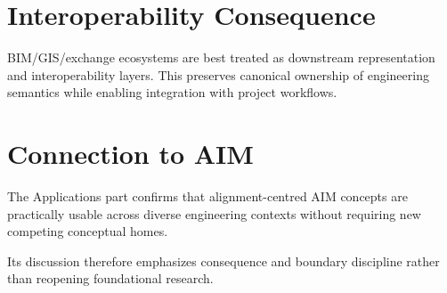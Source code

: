 \section{Interoperability Consequence}

BIM/GIS/exchange ecosystems are best treated as downstream
representation and interoperability layers. This preserves canonical
ownership of engineering semantics while enabling integration with
project workflows.

\section{Connection to AIM}

\begin{summary}
The Applications part confirms that alignment-centred AIM concepts are
practically usable across diverse engineering contexts without requiring
new competing conceptual homes.

Its discussion therefore emphasizes consequence and boundary discipline
rather than reopening foundational research.
\end{summary}
